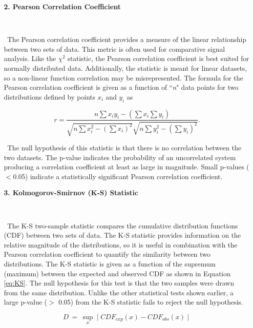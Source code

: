 \noindent \textbf{2. Pearson Correlation Coefficient}

\

\ The Pearson correlation coefficient provides a measure of the linear relationship between two sets of data. 
This metric is often used for comparative signal analysis. 
Like the $\chi^{2}$ statistic, the Pearson correlation coefficient is best suited for normally distributed data. 
Additionally, the statistic is meant for linear datasets, so a non-linear function correlation may be misrepresented. 
The formula for the Pearson correlation coefficient is given as a function of ``\textit{n}" data points for two distributions defined by points $x_{i}$ and $y_{i}$ as

\begin{equation} \label{eq:pearsonR}
r = \dfrac{n\sum{x_{i}y_{i}-(\sum{x_{i}}\sum{y_{i}})}}{ \sqrt{ n \sum{x_{i}^2}-(\sum{x_{i}})^2}\sqrt{n \sum{y_{i}^2}-(\sum{y_{i}})^2}}.
\end{equation}

\ The null hypothesis of this statistic is that there is no correlation between the two datasets. The p-value indicates the probability of an uncorrelated system producing a correlation coefficient at least as large in magnitude. Small p-values ($<$0.05) indicate a statistically significant Pearson correlation coefficient. 

\noindent \textbf{3. Kolmogorov-Smirnov (K-S) Statistic}

\

\ The K-S two-sample statistic compares the cumulative distribution functions (CDF) between two sets of data. 
The K-S statistic provides information on the relative magnitude of the distributions, so it is useful in combination with the Pearson correlation coefficient to quantify the similarity between two distributions.  
The K-S statistic is given as a function of the supremum (maximum) between the expected and observed CDF as shown in Equation \ref{eq:KS}.
The null hypothesis for this test is that the two samples were drawn from the same distribution. 
Unlike the other statistical tests shown earlier, a large p-value ($>$ 0.05) from the K-S statistic fails to reject the null hypothesis. 

\begin{equation} \label{eq:KS}
D  \ = \ \sup\limits_{x} \mid CDF_{exp}(x) - CDF_{obs}(x)\mid
\end{equation}
 



